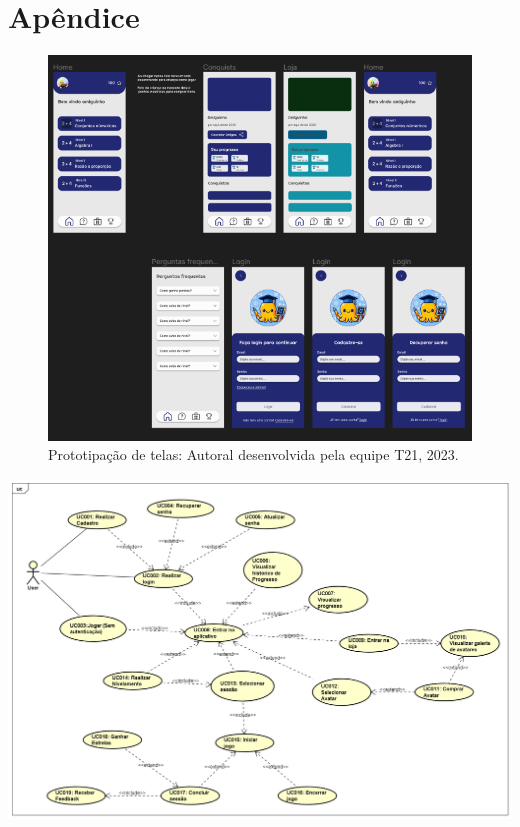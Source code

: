 \documentclass[12pt, openany, oneside, a4paper, english, brazil]{abntex2}   %
\begin{document}
\cite{furlan2016desenvolvimento}


\appendix


\chapter{Apêndice}

\begin{figure}
  \centering
  \includegraphics[width=\linewidth]{figuras/T21.png}
  \caption{Prototipação de telas: Autoral desenvolvida pela equipe T21, 2023.}
  \label{fig:nome-da-imagem}
\end{figure}

\begin{center}
    \includegraphics[width=\linewidth]{figuras/UseCase_TCC-1.png}
    \label{fig:nome-da-imagem}
\end{center}
\end{document}
